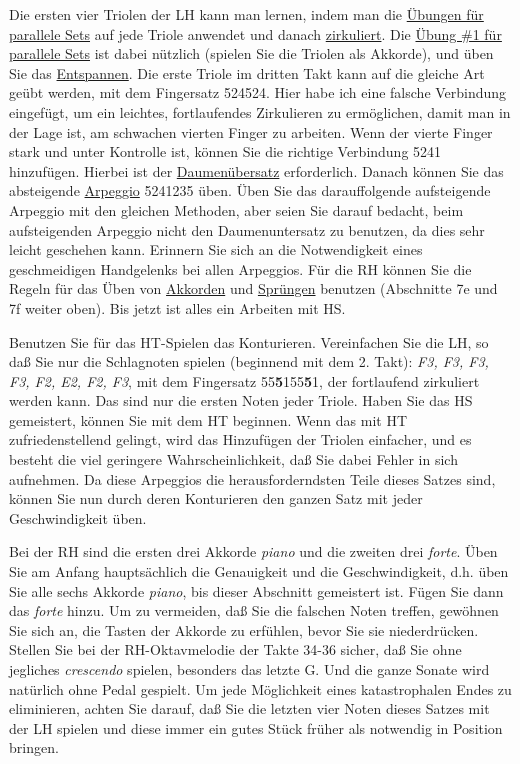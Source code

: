 Die ersten vier Triolen der LH kann man lernen, indem man die \hyperref[c1iii7b]{Übungen für parallele Sets} auf jede Triole anwendet und danach \hyperref[c1iii2]{zirkuliert}.
Die \hyperref[c1iii7b1]{Übung \#1 für parallele Sets} ist dabei nützlich (spielen Sie die Triolen als Akkorde), und üben Sie das \hyperref[c1ii14]{Entspannen}.
Die erste Triole im dritten Takt kann auf die gleiche Art geübt werden, mit dem Fingersatz 524524.
Hier habe ich eine falsche Verbindung eingefügt, um ein leichtes, fortlaufendes Zirkulieren zu ermöglichen, damit man in der Lage ist, am schwachen vierten Finger zu arbeiten.
Wenn der vierte Finger stark und unter Kontrolle ist, können Sie die richtige Verbindung 5241 hinzufügen.
Hierbei ist der \hyperref[c1iii5]{Daumenübersatz} erforderlich.
Danach können Sie das absteigende \hyperref[Arpeggios]{Arpeggio} 5241235 üben.
Üben Sie das darauffolgende aufsteigende Arpeggio mit den gleichen Methoden, aber seien Sie darauf bedacht, beim aufsteigenden Arpeggio nicht den Daumenuntersatz zu benutzen, da dies sehr leicht geschehen kann.
Erinnern Sie sich an die Notwendigkeit eines geschmeidigen Handgelenks bei allen Arpeggios.
Für die RH können Sie die Regeln für das Üben von \hyperref[c1iii7e]{Akkorden} und \hyperref[c1iii7f]{Sprüngen} benutzen (Abschnitte 7e und 7f weiter oben).
Bis jetzt ist alles ein Arbeiten mit HS.

Benutzen Sie für das HT-Spielen das Konturieren.
Vereinfachen Sie die LH, so daß Sie nur die Schlagnoten spielen (beginnend mit dem 2. Takt): \textit{F3, F3, F3, F3, F2, E2, F2, F3}, mit dem Fingersatz 55\textbf{5}155\textbf{5}1, der fortlaufend zirkuliert werden kann.
Das sind nur die ersten Noten jeder Triole.
Haben Sie das HS gemeistert, können Sie mit dem HT beginnen.
Wenn das mit HT zufriedenstellend gelingt, wird das Hinzufügen der Triolen einfacher, und es besteht die viel geringere Wahrscheinlichkeit, daß Sie dabei Fehler in sich aufnehmen.
Da diese Arpeggios die herausforderndsten Teile dieses Satzes sind, können Sie nun durch deren Konturieren den ganzen Satz mit jeder Geschwindigkeit üben.

Bei der RH sind die ersten drei Akkorde \textit{piano} und die zweiten drei \textit{forte}.
Üben Sie am Anfang hauptsächlich die Genauigkeit und die Geschwindigkeit, d.h. üben Sie alle sechs Akkorde \textit{piano}, bis dieser Abschnitt gemeistert ist.
Fügen Sie dann das \textit{forte} hinzu.
Um zu vermeiden, daß Sie die falschen Noten treffen, gewöhnen Sie sich an, die Tasten der Akkorde zu erfühlen, bevor Sie sie niederdrücken.
Stellen Sie bei der RH-Oktavmelodie der Takte 34-36 sicher, daß Sie ohne jegliches \textit{crescendo} spielen, besonders das letzte G.
Und die ganze Sonate wird natürlich ohne Pedal gespielt.
Um jede Möglichkeit eines katastrophalen Endes zu eliminieren, achten Sie darauf, daß Sie die letzten vier Noten dieses Satzes mit der LH spielen und diese immer ein gutes Stück früher als notwendig in Position bringen.


